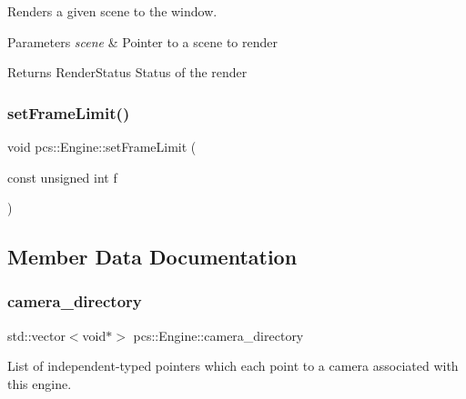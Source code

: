 Renders a given scene to the window. 


\begin{DoxyParams}{Parameters}
{\em scene} & Pointer to a scene to render \\
\hline
\end{DoxyParams}
\begin{DoxyReturn}{Returns}
Render\+Status Status of the render 
\end{DoxyReturn}
\mbox{\label{classpcs_1_1Engine_adafee2edd651c84c76e5f382afd7089b}} 
\subsubsection{\texorpdfstring{set\+Frame\+Limit()}{setFrameLimit()}}
{\footnotesize\ttfamily void pcs\+::\+Engine\+::set\+Frame\+Limit (\begin{DoxyParamCaption}\item[{const unsigned int}]{f }\end{DoxyParamCaption})\hspace{0.3cm}{\ttfamily [inline]}}



\subsection{Member Data Documentation}
\mbox{\label{classpcs_1_1Engine_ad004e5859bca9815210a0f3786b83a02}} 
\subsubsection{\texorpdfstring{camera\+\_\+directory}{camera\_directory}}
{\footnotesize\ttfamily std\+::vector$<$void$\ast$$>$ pcs\+::\+Engine\+::camera\+\_\+directory\hspace{0.3cm}{\ttfamily [private]}}

List of independent-\/typed pointers which each point to a camera associated with this engine. \mbox{\label{classpcs_1_1Engine_af8b3a08a4fb036488acd2bef928e7c16}} 
